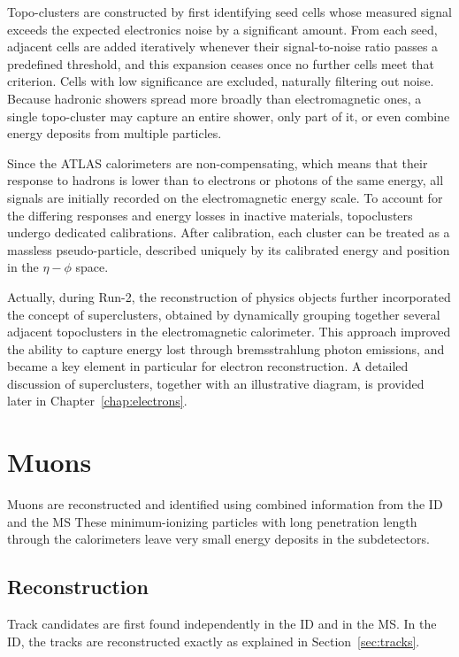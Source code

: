 Topo-clusters are constructed by first identifying seed cells whose measured signal exceeds the expected electronics noise by a significant amount. From each seed, adjacent cells are added iteratively whenever their signal-to-noise ratio passes a predefined threshold, and this expansion ceases once no further cells meet that criterion. Cells with low significance are excluded, naturally filtering out noise. Because hadronic showers spread more broadly than electromagnetic ones, a single topo-cluster may capture an entire shower, only part of it, or even combine energy deposits from multiple particles. 

Since the ATLAS calorimeters are non-compensating, which means that their response to hadrons is lower than to electrons or photons of the same energy, all signals are initially recorded on the electromagnetic energy scale. To account for the differing responses and energy losses in inactive materials, topoclusters undergo dedicated calibrations. After calibration, each cluster can be treated as a massless pseudo-particle, described uniquely by its calibrated energy and position in the $\eta - \phi$ space. 

Actually, during Run-2, the reconstruction of physics objects further incorporated the concept of superclusters, obtained by dynamically grouping together several adjacent topoclusters in the electromagnetic calorimeter. This approach improved the ability to capture energy lost through bremsstrahlung photon emissions, and became a key element in particular for electron reconstruction. A detailed discussion of superclusters, together with an illustrative diagram, is provided later in Chapter~\ref{chap:electrons}.

\section{Muons}
\label{sec:muons}

Muons are reconstructed and identified using combined information from the ID and the MS These minimum-ionizing particles with long penetration length through the calorimeters leave very small energy deposits in the subdetectors.
\subsection*{Reconstruction} 
Track candidates are first found independently in the ID and in the MS. In the ID, the tracks are reconstructed exactly as explained in Section~\ref{sec:tracks}.

